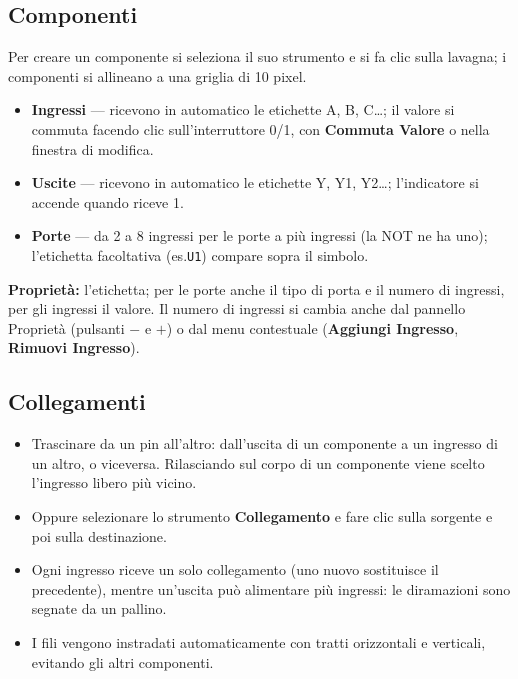 \documentclass[a4paper,11pt]{article}
\newcommand{\uielement}[1]{\textbf{#1}}
\begin{document}
\subsection{Componenti}

Per creare un componente si seleziona il suo strumento e si fa clic sulla lavagna; i componenti
si allineano a una griglia di 10 pixel.

\begin{itemize}
  \item \textbf{Ingressi} --- ricevono in automatico le etichette A, B, C\ldots; il valore si
        commuta facendo clic sull'interruttore 0/1, con \uielement{Commuta Valore} o nella
        finestra di modifica.
  \item \textbf{Uscite} --- ricevono in automatico le etichette Y, Y1, Y2\ldots; l'indicatore si
        accende quando riceve 1.
  \item \textbf{Porte} --- da 2 a 8 ingressi per le porte a più ingressi (la NOT ne ha uno);
        l'etichetta facoltativa (es.\@ \texttt{U1}) compare sopra il simbolo.
\end{itemize}

\textbf{Proprietà:} l'etichetta; per le porte anche il tipo di porta e il numero di ingressi,
per gli ingressi il valore. Il numero di ingressi si cambia anche dal pannello Proprietà
(pulsanti $-$ e $+$) o dal menu contestuale (\uielement{Aggiungi Ingresso},
\uielement{Rimuovi Ingresso}).

\subsection{Collegamenti}

\begin{itemize}
  \item Trascinare da un pin all'altro: dall'uscita di un componente a un ingresso di un altro, o
        viceversa. Rilasciando sul corpo di un componente viene scelto l'ingresso libero più
        vicino.
  \item Oppure selezionare lo strumento \uielement{Collegamento} e fare clic sulla sorgente e poi
        sulla destinazione.
  \item Ogni ingresso riceve un solo collegamento (uno nuovo sostituisce il precedente), mentre
        un'uscita può alimentare più ingressi: le diramazioni sono segnate da un pallino.
  \item I fili vengono instradati automaticamente con tratti orizzontali e verticali, evitando gli
        altri componenti.
\end{itemize}
\end{document}
